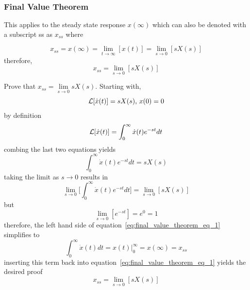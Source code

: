 \documentclass[12pt,letter]{article}
\begin{document}
 


\subsubsection{Final Value Theorem}
This applies to the steady state response $x(\infty)$ which can also be denoted with a subscript ss as $x_{ss}$ where

\begin{equation}
x_{ss} = x(\infty)  = \lim\limits_{t\rightarrow \infty} [x(t)]  =  \lim\limits_{s\rightarrow 0} [s X(s)]
\end{equation}
therefore, 
\begin{equation}
x_{ss} =  \lim\limits_{s\rightarrow 0} [s X(s)]
\end{equation}


\begin{mdframed}[middlelinewidth=0.5mm]
\begin{center}
\end{center}

Prove that $x_{ss} = \lim\limits_{s\rightarrow 0} s X(s)$. Starting with, 
\begin{equation}
\mathcal{L}{\left[\dot{x}(t)\right]} = s X(s)\text{, } x(0)=0
\end{equation}
by definition
\begin{equation}
\mathcal{L}{\left[\dot{x}(t)\right]} = \int_0^{\infty} \dot{x}(t)e^{-s t}dt
\end{equation}
combing the last two equations yields
\begin{equation}
\int_0^{\infty} \dot{x}(t)e^{-s t}dt = s X(s)
\end{equation}
taking the limit as $s \rightarrow 0$ results in 
\begin{equation}
\lim\limits_{s \rightarrow 0} \bigg[ \int_0^{\infty} \dot{x}(t)e^{-s t}dt \bigg] = \lim\limits_{s \rightarrow 0}[s X(s)]
\label{eq:final_value_theorem_eq_1}
\end{equation}
but
\begin{equation}
\lim\limits_{s \rightarrow 0} [ e^{-s t}] = e^0 = 1
\end{equation}
therefore, the left hand side of equation~\ref{eq:final_value_theorem_eq_1} simplifies to 
\begin{equation}
\int_0^{\infty} \dot{x}(t)dt = x(t)  \big|_{0}^{\infty} = x(\infty) = x_{ss}
\end{equation}
inserting this term back into equation~\ref{eq:final_value_theorem_eq_1} yields the desired proof
\begin{equation}
x_{ss} =  \lim\limits_{s\rightarrow 0} [s X(s)]
\end{equation}

\end{mdframed}
\end{document}
